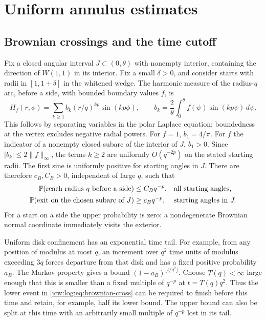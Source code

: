 \documentclass[11pt,letterpaper]{article}
\theoremstyle{remark}\newtheorem{remark}[theorem]{Remark}
\newcommand{\Prob}{\mathbb P}
\newcommand{\1}{\mathbf1}
\begin{document}
\section{Uniform annulus estimates}\label{icw:log:sec:annuli}
\subsection{Brownian crossings and the time cutoff}
Fix a closed angular interval $J\subset(0,\theta)$ with nonempty interior,
containing the direction of $W(1,1)$ in its interior. Fix a small
$\delta>0$, and consider starts with radii in $[1,1+\delta]$ in the
whitened wedge. The harmonic measure of the radius-$q$ arc, before a
side, with bounded boundary values $f$, is
\begin{equation}\label{icw:log:eq:harmonic}
 H_f(r,\phi)=\sum_{k\ge1}b_k(r/q)^{kp}\sin(kp\phi),\qquad
 b_k=\frac2\theta\int_0^\theta f(\psi)\sin(kp\psi)\,d\psi.
\end{equation}
This follows by separating variables in the polar Laplace equation;
boundedness at the vertex excludes negative radial powers. For $f=1$,
$b_1=4/\pi$. For $f$ the indicator of a nonempty closed subarc of the
interior of $J$, $b_1>0$. Since $|b_k|\le2\|f\|_\infty$, the terms
$k\ge2$ are uniformly $O(q^{-2p})$ on the stated starting radii.
The first sine is uniformly positive for starting angles in $J$.
There are therefore $c_B,C_B>0$, independent of large $q$, such that
\begin{align}
 \Prob(\text{reach radius }q\text{ before a side})&\le C_Bq^{-p},
       &&\text{all starting angles},\label{icw:log:eq:brownian-cross}\\
 \Prob(\text{exit on the chosen subarc of }J)&\ge c_Bq^{-p},
       &&\text{starting angles in }J.\notag
\end{align}
For a start on a side the upper probability is zero: a nondegenerate
Brownian normal coordinate immediately visits the exterior.

Uniform disk confinement has an exponential time tail. For example,
from any position of modulus at most $q$, an increment over $q^2$ time
units of modulus exceeding $3q$ forces departure from that disk and has
a fixed positive probability $a_B$. The Markov property gives a bound
$(1-a_B)^{\lfloor t/q^2\rfloor}$. Choose $T(q)<\infty$ large enough
that this is smaller than a fixed multiple of $q^{-p}$ at $t=T(q)q^2$.
Thus the lower event in \eqref{icw:log:eq:brownian-cross} can be required to
finish before this time and retain, for example, half its lower bound.
The upper bound can also be split at this time with an arbitrarily small
multiple of $q^{-p}$ lost in its tail.
\end{document}
